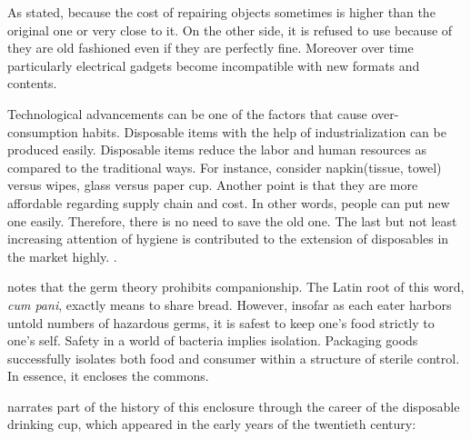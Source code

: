 As stated,  \citep[viii]{hawkins2005ethics} because the cost of repairing objects sometimes is higher than the original one or very close to it. On the other side, it is refused to use because of they are old fashioned even if they are perfectly fine. Moreover over time particularly electrical gadgets become incompatible with new formats and contents.

Technological advancements can be one of the factors that cause over-consumption habits. Disposable items with the help of industrialization can be produced easily. Disposable items reduce the labor and human resources as compared to the traditional ways. For instance, consider napkin(tissue, towel) versus wipes, glass versus paper cup. Another point is that they are more affordable regarding supply chain and cost. In other words, people can put new one easily. Therefore, there is no need to save the old one. The last but not least increasing attention of hygiene is contributed to the extension of disposables in the market highly.  \citep[70]{kennedy2007ontology}.

\cite{kennedy2007ontology} notes that the germ theory prohibits companionship. The Latin root of this word, \textit{cum pani}, exactly means to share bread. However, insofar as each eater harbors untold numbers of hazardous germs, it is safest to keep one’s food strictly to one’s self. Safety in a world of bacteria implies isolation. Packaging goods successfully isolates both food and consumer within a structure of sterile control. In essence, it encloses the commons.

\citep[176--177]{strasser1999waste} narrates part of the history of this enclosure through the career of the disposable drinking cup, which appeared in the early years of the twentieth century:

